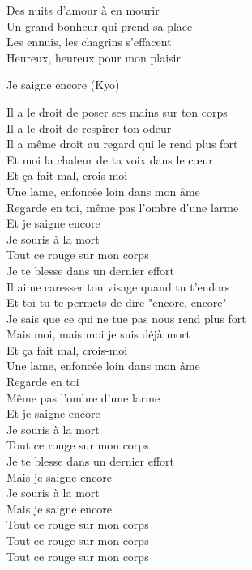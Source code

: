 \documentclass{novel}
\begin{document}
{\begin{minipage}[t][0.5\textheight][t]{\textwidth}
\begin{multicols}{2}
Des nuits d'amour à en mourir \\
Un grand bonheur qui prend sa place \\
Les ennuis, les chagrins s'effacent \\
Heureux, heureux pour mon plaisir
\end{multicols}
\end{minipage}

\begin{minipage}[t][0.5\textheight][t]{\textwidth}
\vspace{0.00\textheight}
\h*{Je saigne encore (Kyo)}
\begin{multicols}{2}
Il a le droit de poser ses mains sur ton corps \\
Il a le droit de respirer ton odeur \\
Il a même droit au regard qui le rend plus fort \\
Et moi la chaleur de ta voix dans le cœur \\

Et ça fait mal, crois-moi \\
Une lame, enfoncée loin dans mon âme \\
Regarde en toi, même pas l'ombre d'une larme \\
Et je saigne encore \\
Je souris à la mort \\
Tout ce rouge sur mon corps \\
Je te blesse dans un dernier effort \\

Il aime caresser ton visage quand tu t'endors \\
Et toi tu te permets de dire "encore, encore" \\
Je sais que ce qui ne tue pas nous rend plus fort \\
Mais moi, mais moi je suis déjà mort \\

Et ça fait mal, crois-moi \\
Une lame, enfoncée loin dans mon âme \\
Regarde en toi \\
Même pas l'ombre d'une larme \\
Et je saigne encore \\
Je souris à la mort \\
Tout ce rouge sur mon corps \\
Je te blesse dans un dernier effort \\

Mais je saigne encore \\
Je souris à la mort \\
Mais je saigne encore \\
Tout ce rouge sur mon corps \\
Tout ce rouge sur mon corps \\
Tout ce rouge sur mon corps
\end{multicols}
\end{minipage}

}
\end{document}

